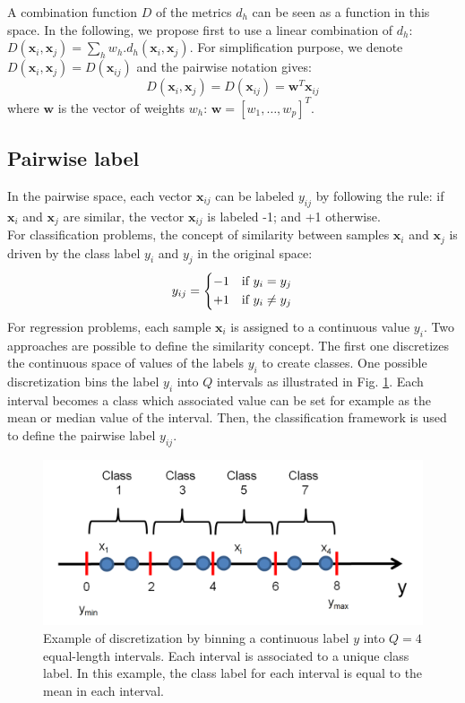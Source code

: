 A combination function $D$ of the metrics $d_h$ can be seen as a function in this space. In the following, we propose first to use a linear combination of $d_h$: $D(\textbf{x}_i,\textbf{x}_j) = \sum_h w_h.d_h(\textbf{x}_i,\textbf{x}_j)$. For simplification purpose, we denote $D(\textbf{x}_i,\textbf{x}_j) = D(\textbf{x}_{ij})$ and the pairwise notation gives:
\begin{equation}
D(\textbf{x}_i,\textbf{x}_j) = D(\textbf{x}_{ij})=\textbf{w}^T\textbf{x}_{ij}
\label{eq:D_linear}
\end{equation}
where $\textbf{w}$ is the vector of weights $w_h$: $\textbf{w}=[w_1, \ldots, w_p]^T$.

\subsection{Pairwise label}
In the pairwise space, each vector $\textbf{x}_{ij}$ can be labeled $y_{ij}$ by following the rule: if $\textbf{x}_i$ and $\textbf{x}_j$ are similar, the vector $\textbf{x}_{ij}$ is labeled -1; and +1 otherwise. \\
For classification problems, the concept of similarity between samples $\textbf{x}_i$ and $\textbf{x}_j$ is driven by the class label $y_i$ and $y_j$ in the original space:
\begin{equation}
	y_{ij} = 
	\left\{
	\begin{split}
	-1 \text{\quad if } y_i = y_j\\ 
	+1 \text{\quad if } y_i \neq y_j
	\end{split}
	\right.
\end{equation}
For regression problems, each sample $\textbf{x}_i$ is assigned to a continuous value $y_i$. Two approaches are possible to define the similarity concept. The first one discretizes the continuous space of values of the labels $y_i$ to create classes. One possible discretization bins the label $y_i$ into $Q$ intervals as illustrated in Fig. \ref{fig:Discretize_binning}. Each interval becomes a class which associated value can be set for example as the mean or median value of the interval. Then, the classification framework is used to define the pairwise label $y_{ij}$.

\begin{figure}[h!]
\centering
\includegraphics[width=0.6\linewidth]{images/Discretize_binning}
\caption{Example of discretization by binning a continuous label $y$ into $Q=4$ equal-length intervals. Each interval is associated to a unique class label. In this example, the class label for each interval is equal to the mean in each interval.}
\label{fig:Discretize_binning}
\end{figure}


